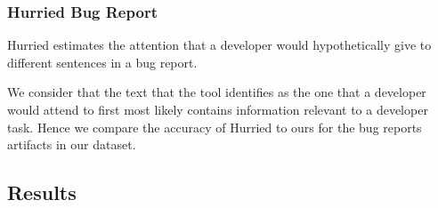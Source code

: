 \subsubsection{Hurried Bug Report}


\acf{Hurried} estimates the attention that a developer would hypothetically give to different sentences in a bug report. 


We consider that the text that the tool identifies as the one that a developer would attend to first most likely contains information relevant to a developer task. Hence we compare the accuracy of \acf{Hurried} to ours for the bug reports artifacts in our dataset.


\subsection{Results}














